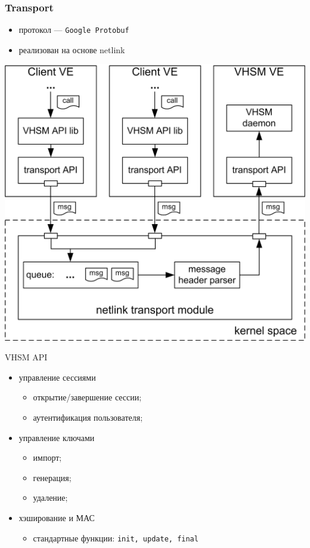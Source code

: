 \documentclass[utf8, 11pt]{beamer}
\begin{document}
\begin{frame}[fragile]
\frametitle{Transport}
\begin{itemize}
\item протокол --- \texttt{Google Protobuf}
\item реализован на основе netlink
\end{itemize}
\begin{center}
\includegraphics[scale=0.65]{img4}
\end{center}
\end{frame}

\begin{frame}{VHSM API}

\begin{itemize}
\item управление сессиями
\begin{itemize}
\item открытие/завершение сессии;
\item аутентификация пользователя;
\end{itemize}

\item управление ключами
\begin{itemize}
\item импорт;
\item генерация;
\item удаление;
\end{itemize}

\item хэширование и МАС
\begin{itemize}
\item стандартные функции: \texttt{init, update, final}
\end{itemize}
\end{itemize}

\vspace*{\fill}

\end{frame}
\end{document}
